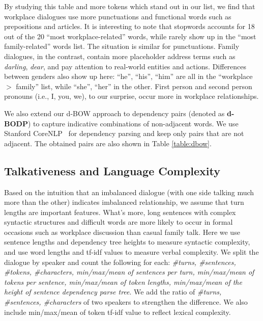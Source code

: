 By studying this table and more tokens which stand out in our list, 
we find that workplace dialogues use more punctuations and functional 
words such as prepositions and articles. 
It is interesting to note that stopwords accounts for 18 out of the 
20 ``most workplace-related'' words, while rarely show up in the ``most family-related'' words list. The situation is similar for punctuations.
Family dialogues, in the contrast, contain more placeholder address terms such as  \textit{darling}, \textit{dear}, and pay attention to real-world entities and actions. Differences between genders also show up here: ``he'', ``his'', ``him'' are all in the ``workplace $>$ family'' list, while ``she'', ``her'' in the other. First person and second person pronouns (i.e., I, you, we), 
to our surprise, occur more in workplace relationships. 

We also extend our d-BOW approach to dependency pairs 
(denoted as \textbf{d-BODP}) to capture indicative combinations of 
non-adjacent words. We use Stanford CoreNLP~\cite{stanfordcorenlp} 
for dependency parsing and keep only pairs that are not adjacent. 
The obtained pairs are also shown in Table \ref{table:dbow}.

\subsection{Talkativeness and Language Complexity}
Based on the intuition that an imbalanced dialogue 
(with one side talking much more than the other) 
indicates imbalanced relationship, we assume that turn lengths are 
important features. What's more, long sentences with complex 
syntactic structures and difficult words are more 
likely to occur in formal occasions such as workplace discussion
than casual family talk. 
Here we use sentence lengths and dependency tree heights to measure 
syntactic complexity, 
and use word lengths and tf-idf values to measure verbal complexity. 
We split the dialogue by speaker and count the following for 
each: \textit{\#turns, \#sentences, \#tokens, \#characters, min/max/mean of sentences per turn, 
min/max/mean of tokens per sentence, min/max/mean of token lengths, min/max/mean of the 
height of sentence dependency parse tree}. We add the ratio of \textit{\#turns, \#sentences, \#characters} of two speakers to strengthen the difference. 
We also include min/max/mean of token tf-idf value to 
reflect lexical complexity.



